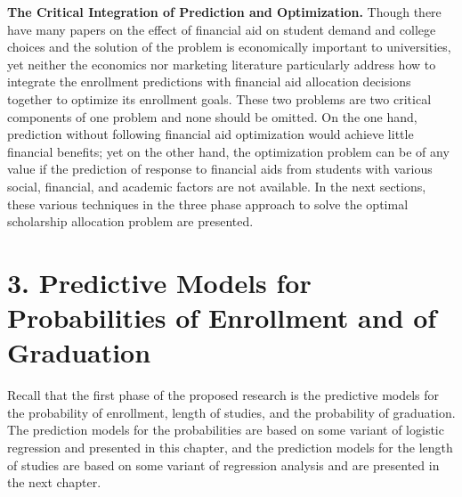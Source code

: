\documentclass[12pt,english]{report}
\begin{document}



\vspace{0.15in}
\noindent \textbf{The Critical Integration of Prediction and Optimization.} Though there have many papers on the effect of financial aid on student demand and college choices and the solution of the problem is economically important to universities, yet neither the economics nor marketing literature particularly address how to integrate the enrollment predictions with financial aid allocation decisions together to optimize its enrollment goals.  These two problems are two critical components of one problem and none should be omitted. On the one hand, prediction without following financial aid optimization would achieve little financial benefits; yet on the other hand, the optimization problem can be of any value if the prediction of response to financial aids from students with various social, financial, and academic factors are not available.  In the next sections, these various techniques in the three phase approach to solve the optimal scholarship allocation problem are presented.  

\chapter{3. Predictive Models for Probabilities of Enrollment and of Graduation}
Recall that the first phase of the proposed research is the predictive models for the probability of enrollment, length of studies, and the probability of graduation. The prediction models for the probabilities are based on some variant of logistic regression and presented in this chapter, and the prediction models for the length of studies are based on some variant of regression analysis and are presented in the next chapter. 
\end{document}
